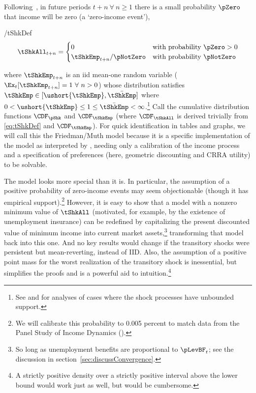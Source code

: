 \documentclass[BufferStockTheory]{subfiles}
\begin{document}
Following~\cite{zeldesStochastic}, in future periods $t+n ~\forall~ n \geq 1$ there is a small probability $\pZero$ that income will be zero (a `zero-income event'),
\begin{verbatimwrite}{\EqDir/tShkDef}
  \begin{equation}
    \tShkAll _{t+n}=
    \begin{cases}
      0\phantom{_{t+1}/\pNotZero} & \text{with probability $\pZero>0$} \\
      \tShkEmp_{t+n}/\pNotZero      & \text{with probability $\pNotZero  $} %
    \end{cases} \label{eq:tShkDef}
  \end{equation}
\end{verbatimwrite}

where $\tShkEmp_{t+n}$ is an iid mean-one random variable
($\Ex_{t}[{\tShkEmp}_{t+n}]=1~\forall~n>0$)
whose distribution satisfies $\tShkEmp \in \lbrack \ushort{\tShkEmp},\bar{\tShkEmp}\rbrack$
where $0<\ushort{\tShkEmp} \leq 1 \leq \bar{\tShkEmp}<\infty$.\footnote{See \cite{rabaultBorrowing} and \cite{lsIncFluct} for analyses of cases where the shock processes have unbounded support.}  Call the cumulative
distribution functions $\CDF_{\pShk}$ and $\CDF_{\tShkEmp}$ (where $\CDF_{\tShkAll}$
 is derived trivially from \eqref{eq:tShkDef} and $\CDF_{\tShkEmp}$).  For quick identification in tables and graphs, we will call this the Friedman/Muth model because it is a specific implementation of the \cite{friedmanATheory} model as interpreted by \cite{muthOptimal}, needing only a calibration of the income process and a specification of preferences (here, geometric discounting and CRRA utility) to be solvable.

\hypertarget{PDV}{}
The model looks more special than it is.  In particular, the
assumption of a positive probability of zero-income events may seem
objectionable (though it has empirical support).\footnote{We will calibrate this probability to 0.005 percent to match data from the Panel Study of Income Dynamics (\cite{carrollBrookings}).}
However, it is easy to show that a model with a
nonzero minimum value of $\tShkAll$ (motivated, for example, by the
existence of unemployment insurance) can be redefined by capitalizing
the present discounted value of minimum income into current market assets,\footnote{So long
  as unemployment benefits are
  proportional to $\pLevBF_{t}$; see the discussion in
  section~\ref{sec:discussConvergence}.}  transforming
that model back into this one.  And no key results would change if the transitory shocks were persistent but mean-reverting, instead of IID.  Also, the assumption of a positive point mass for the worst realization of the transitory shock is inessential, but simplifies the proofs and is a powerful aid to intuition.\footnote{A strictly positive density over a strictly positive interval above the lower bound would work just as well, but would be cumbersome.}
\end{document}
